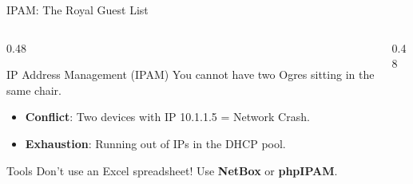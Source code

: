 \documentclass[aspectratio=169]{beamer}  %
\begin{document}
\begin{frame}{IPAM: The Royal Guest List}
    \begin{columns}[T]
        \begin{column}{0.48\textwidth}
            \begin{block}{IP Address Management (IPAM)}
                \footnotesize
                You cannot have two Ogres sitting in the same chair.
                \begin{itemize}
                    \item \textbf{Conflict}: Two devices with IP 10.1.1.5 = Network Crash.
                    \item \textbf{Exhaustion}: Running out of IPs in the DHCP pool.
                \end{itemize}
            \end{block}
            \begin{exampleblock}{Tools}
                \footnotesize
                Don't use an Excel spreadsheet! Use \textbf{NetBox} or \textbf{phpIPAM}.
            \end{exampleblock}
        \end{column}
        \begin{column}{0.48\textwidth}
                    \begin{center}
            \end{center}
        \end{column}
    \end{columns}
\end{frame}
\end{document}
